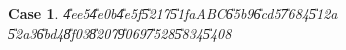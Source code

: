\documentclass[12pt,a4paper]{article}
\newtheorem{case}[theorem]{Case}
\begin{document}
\clearpage%

\begin{case}
\U{4ee5}\U{4e0b}\U{4e5f}\U{5217}\U{51fa}ABC\U{65b9}\U{6cd5}\U{7684}\U{512a}%
\U{52a3}\U{6bd4}\U{8f03}\U{8207}\U{9069}\U{7528}\U{5834}\U{5408}
\end{case}

%
\begin{center}

\end{center}%

%

%

\bigskip
\end{document}
